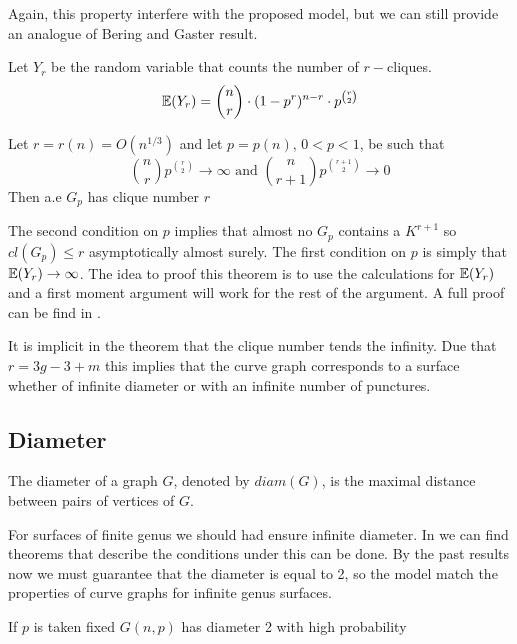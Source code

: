 Again, this property interfere with the proposed model, but we can still provide an analogue of Bering and Gaster result.

Let $Y_{r}$ be the random variable that counts the number of $r-$cliques.
$$\mathbb{E}(Y_{r}) = \binom{n}{r} \cdot (1-p^{r})^{n-r} \cdot p^{\binom{r}{2}}  $$

\begin{theorem}
Let $r = r(n) = O(n^{1/3})$ and let $p=p(n)$, $0<p<1$, be such that
$$\binom{n}{r} p^{\binom{r}{2}} \to \infty \text{ and } \binom{n}{r+1} p^{\binom{r+1}{2}} \to 0 $$
Then a.e $G_{p}$ has clique number $r$
\end{theorem}
The second condition on $p$ implies that almost no $G_{p}$ contains a $K^{r+1}$ so $cl(G_{p})\leq r$ asymptotically almost surely. The first condition on $p$ is simply that $\mathbb{E} (Y_{r}) \to  \infty$. The idea to proof this theorem is to use the calculations for $\mathbb{E}(Y_{r})$ and a first moment argument will work for the rest of the argument. A full proof can be find in \cite[Bollobás, p.290]{Bollobas}.

It is implicit in the theorem that the clique number tends the infinity. Due that $r=3g-3+m$ this implies that the curve graph corresponds to a surface whether of infinite diameter or with an infinite number of punctures.

\subsection{Diameter}

The diameter of a graph $G$, denoted by $diam(G)$, is the maximal distance between pairs of vertices of $G$.

For surfaces of finite genus we should had ensure infinite diameter. In \cite[Bollobás, p.259]{Bollobas} we can find theorems that describe the conditions under this can be done. By the past results now we must guarantee that the diameter is equal to 2, so the model match the properties of curve graphs for infinite genus surfaces.


\begin{theorem}
If $p$ is taken fixed $G(n,p)$ has diameter 2 with high probability 
\end{theorem}

